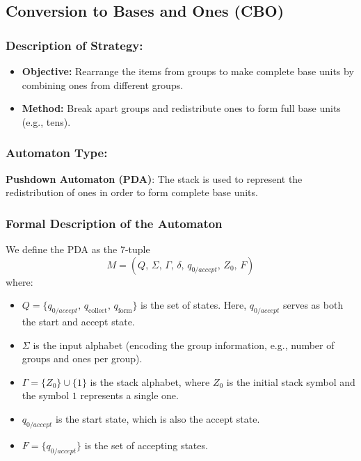\documentclass[11pt]{article}
\begin{document}
\subsection*{Conversion to Bases and Ones (CBO)}

\subsubsection*{Description of Strategy:}
\begin{itemize}
    \item \textbf{Objective:} Rearrange the items from groups to make complete base units by combining ones from different groups.
    \item \textbf{Method:} Break apart groups and redistribute ones to form full base units (e.g., tens).
\end{itemize}

\subsubsection*{Automaton Type:}
\textbf{Pushdown Automaton (PDA)}: The stack is used to represent the redistribution of ones in order to form complete base units.

\subsubsection*{Formal Description of the Automaton}

We define the PDA as the 7-tuple
\[
M = (Q,\, \Sigma,\, \Gamma,\, \delta,\, q_{0/accept},\, Z_0,\, F)
\]
where:
\begin{itemize}
    \item \(Q = \{q_{0/accept},\, q_{\text{collect}},\, q_{\text{form}}\}\) is the set of states. Here, \(q_{0/accept}\) serves as both the start and accept state.
    \item \(\Sigma\) is the input alphabet (encoding the group information, e.g., number of groups and ones per group).
    \item \(\Gamma = \{Z_0\} \cup \{1\}\) is the stack alphabet, where \(Z_0\) is the initial stack symbol and the symbol \(1\) represents a single one.
    \item \(q_{0/accept}\) is the start state, which is also the accept state.
    \item \(F = \{q_{0/accept}\}\) is the set of accepting states.
\end{itemize}
\end{document}
